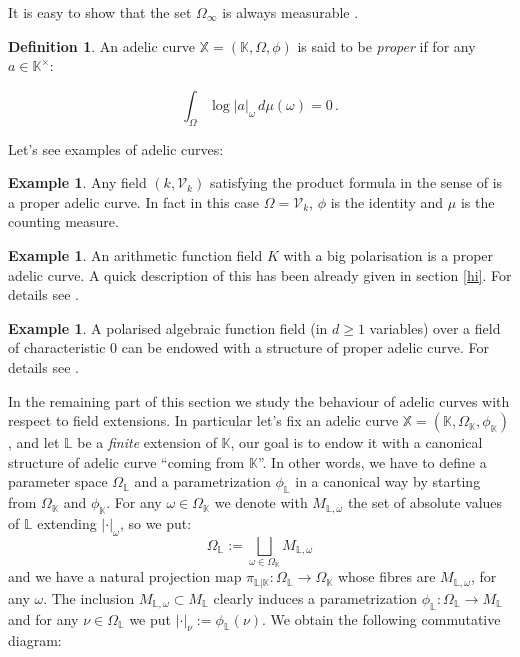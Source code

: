 \documentclass[10 pt,a4paper]{article}
\theoremstyle{plain}
\theoremstyle{definition}
\newtheorem{defn}[thm]{Definition}
\newtheorem{expl}[thm]{Example}
\theoremstyle{named}
\begin{document}
It is easy to show that the set $\Omega_{\infty}$ is always measurable \cite[Proposition 3.1.1]{Ch-Mo}.

\begin{defn}
An adelic curve $\mathbb X=(\mathbb K,\Omega,\phi)$ is said to be \emph{proper}  if for any $a\in \mathbb K^\times$:

\begin{equation}\label{pr_for}
\int_{\Omega} \log |a|_\omega\, d\mu(\omega)=0\,.
\end{equation}
\end{defn}


Let's see  examples of adelic curves:

\begin{expl}\label{counting}
Any field $(k,\mathcal V_k)$ satisfying the product formula in the sense of \cite{C} is a proper adelic curve. In fact in this case $\Omega=\mathcal V_k$, $\phi$ is the identity and  $\mu$ is the counting measure.
\end{expl}

\begin{expl}
An arithmetic function field  $K$ with a big polarisation is a proper  adelic curve. A quick description of this has been already given in section \ref{hi}. For details see \cite[Section 3]{vo}. 
\end{expl}
\begin{expl} 
A polarised algebraic function field (in $d\ge 1$ variables) over a field of characteristic $0$ can be endowed with a structure of proper adelic curve. For details see  \cite[3.2.4]{Ch-Mo}. 
\end{expl}
In the remaining part of this section we study the behaviour of adelic curves with respect to field extensions. In particular  let's  fix an adelic curve $\mathbb X=(\mathbb K,\Omega_{\mathbb K},\phi_{\mathbb K})$, and let $\mathbb L$ be a \emph{finite} extension of $\mathbb K$, our goal is to endow it with a canonical structure of adelic curve  ``coming from $\mathbb K$''. In other words, we have to define a parameter space $\Omega_{\mathbb L}$ and a parametrization $\phi_{\mathbb L}$ in a canonical way by starting from $\Omega_{\mathbb K}$ and $\phi_{\mathbb K}$. For any $\omega\in\Omega_{\mathbb K}$ we denote with $M_{\mathbb L,\omega}$ the set of absolute values of $\mathbb L$ extending $|\cdot|_{\omega}$, so we put:
$$\Omega_{\mathbb L}:=\bigsqcup_{\omega\in\Omega_{\mathbb K}}M_{\mathbb L,\omega}$$
and we have a natural projection map $\pi_{\mathbb L|\mathbb K}:\Omega_{\mathbb L}\to \Omega_{\mathbb K}$ whose fibres are $M_{\mathbb L,\omega}$, for any $\omega$. The inclusion $M_{\mathbb L,\omega}\subset M_{\mathbb L}$ clearly induces a parametrization $\phi_{\mathbb L}\colon\Omega_{\mathbb L}\to M_{\mathbb L}$ and for any $\nu\in\Omega_{\mathbb L}$ we put $|\cdot|_\nu:=\phi_{\mathbb L}(\nu)$. We obtain the following commutative diagram:
\end{document}
